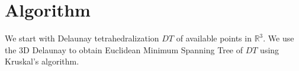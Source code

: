 \documentclass[12pt,a4paper]{article}
\begin{document}
%    

\section{Algorithm}

We start with Delaunay tetrahedralization $DT$ of available points in $\mathbb{R}^3$. We use the 3D Delaunay to obtain Euclidean Minimum Spanning Tree of $DT$ using Kruskal's  algorithm.
\end{document}
